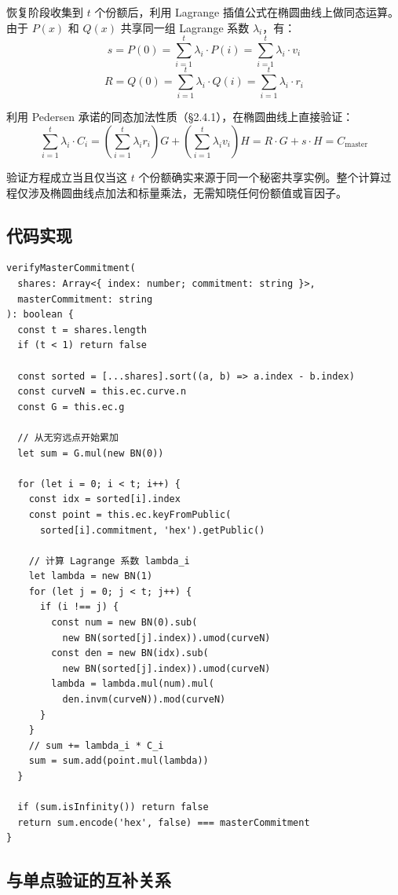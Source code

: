 \documentclass[UTF8,a4paper,zihao=-4,openany]{ctexrep}
\begin{document}
恢复阶段收集到 $t$ 个份额后，利用 Lagrange 插值公式在椭圆曲线上做同态运算。由于 $P(x)$ 和 $Q(x)$ 共享同一组 Lagrange 系数 $\lambda_i$，有：
\[
s = P(0) = \sum_{i=1}^{t} \lambda_i \cdot P(i) = \sum_{i=1}^{t} \lambda_i \cdot v_i
\]
\[
R = Q(0) = \sum_{i=1}^{t} \lambda_i \cdot Q(i) = \sum_{i=1}^{t} \lambda_i \cdot r_i
\]

利用 Pedersen 承诺的同态加法性质（§2.4.1），在椭圆曲线上直接验证：
\[
\sum_{i=1}^{t} \lambda_i \cdot C_i =
\left(\sum_{i=1}^{t} \lambda_i r_i\right) G +
\left(\sum_{i=1}^{t} \lambda_i v_i\right) H =
R \cdot G + s \cdot H = C_{\text{master}}
\]

验证方程成立当且仅当这 $t$ 个份额确实来源于同一个秘密共享实例。整个计算过程仅涉及椭圆曲线点加法和标量乘法，无需知晓任何份额值或盲因子。

\subsection{代码实现}

\begin{lstlisting}[caption={主承诺同态聚合验证 (shamir.ts:271-314, 节选)}]
verifyMasterCommitment(
  shares: Array<{ index: number; commitment: string }>,
  masterCommitment: string
): boolean {
  const t = shares.length
  if (t < 1) return false

  const sorted = [...shares].sort((a, b) => a.index - b.index)
  const curveN = this.ec.curve.n
  const G = this.ec.g

  // 从无穷远点开始累加
  let sum = G.mul(new BN(0))

  for (let i = 0; i < t; i++) {
    const idx = sorted[i].index
    const point = this.ec.keyFromPublic(
      sorted[i].commitment, 'hex').getPublic()

    // 计算 Lagrange 系数 lambda_i
    let lambda = new BN(1)
    for (let j = 0; j < t; j++) {
      if (i !== j) {
        const num = new BN(0).sub(
          new BN(sorted[j].index)).umod(curveN)
        const den = new BN(idx).sub(
          new BN(sorted[j].index)).umod(curveN)
        lambda = lambda.mul(num).mul(
          den.invm(curveN)).mod(curveN)
      }
    }
    // sum += lambda_i * C_i
    sum = sum.add(point.mul(lambda))
  }

  if (sum.isInfinity()) return false
  return sum.encode('hex', false) === masterCommitment
}
\end{lstlisting}

\subsection{与单点验证的互补关系}
\end{document}
